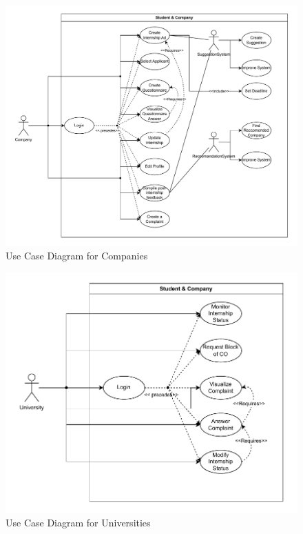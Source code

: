 \begin{figure}[H]
    \centering
    \includegraphics[width=1.0\textwidth]{Images/UC_Company.pdf}
    \caption{Use Case Diagram for Companies}
    \label{fig:use-case-diagram-companies}
\end{figure}

\begin{figure}[H]
    \centering
    \includegraphics[width=1.0\textwidth]{Images/UC_University.pdf}
    \caption{Use Case Diagram for Universities}
    \label{fig:use-case-diagram-universities}
\end{figure}

